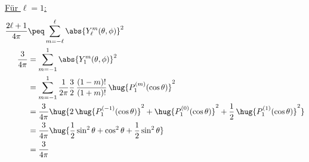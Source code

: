 \documentclass[ex,minted]{exercise_4.0}
\begin{document}
\underline{Für $\ell=1$:}
\begin{align*}
    \frac{2\ell+1}{4\pi} &\peq \sum_{m=-\ell}^\ell \abs{Y_\ell^m(\theta, \phi)}^2\\
    \frac{3}{4\pi} &= \sum_{m=-1}^1 \abs{Y_1^m(\theta, \phi)}^2\\
    &= \sum_{m=-1}^1 \frac{1}{2\pi}\frac{3}{2} \, \frac{(1- m)!}{(1+ m)!} \,\hug{ P_1^{(m)}(\cos \theta)}^2\\
    &= \frac{3}{4\pi} \hug{2 \,\hug{P_1^{(-1)}(\cos \theta)}^2 
    + \hug{ P_1^{(0)}(\cos \theta)}^2 + \frac{1}{2} \,\hug{P_1^{(1)}(\cos \theta)}^2}\\
    &= \frac{3}{4\pi} \hug{\frac12 \sin^2\theta + \cos^2\theta + \frac{1}{2} \sin^2\theta}\\
    &= \frac{3}{4\pi} 
\end{align*}
\end{document}
